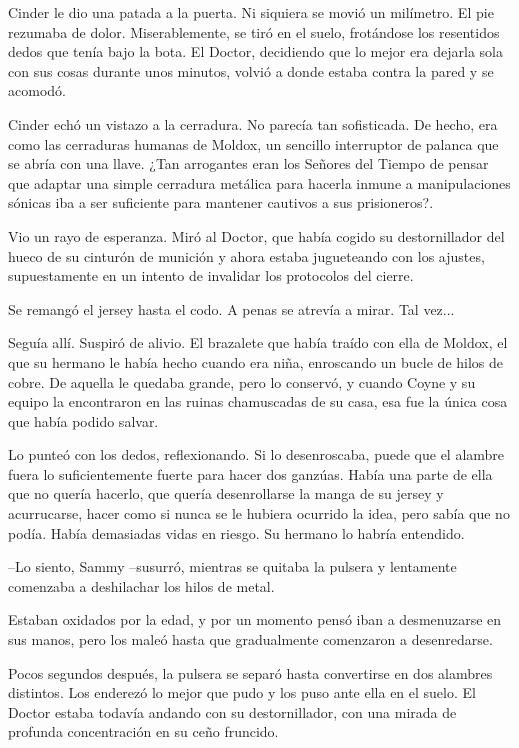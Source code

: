 Cinder le dio una patada a la puerta. Ni siquiera se movió un milímetro. El pie rezumaba de dolor. Miserablemente, se tiró en el suelo, frotándose los resentidos dedos que tenía bajo la bota. El Doctor, decidiendo que lo mejor era dejarla sola con sus cosas durante unos minutos, volvió a donde estaba contra la pared y se acomodó.

Cinder echó un vistazo a la cerradura. No parecía tan sofisticada. De hecho, era como las cerraduras humanas de Moldox, un sencillo interruptor de palanca que se abría con una llave. ¿Tan arrogantes eran los Señores del Tiempo de pensar que adaptar una simple cerradura metálica para hacerla inmune a manipulaciones sónicas iba a ser suficiente para mantener cautivos a sus prisioneros?.

Vio un rayo de esperanza. Miró al Doctor, que había cogido su destornillador del hueco de su cinturón de munición y ahora estaba jugueteando con los ajustes, supuestamente en un intento de invalidar los protocolos del cierre.

Se remangó el jersey hasta el codo. A penas se atrevía a mirar. Tal vez...

Seguía allí. Suspiró de alivio. El brazalete que había traído con ella de Moldox, el que su hermano le había hecho cuando era niña, enroscando un bucle de hilos de cobre. De aquella le quedaba grande, pero lo conservó, y cuando Coyne y su equipo la encontraron en las ruinas chamuscadas de su casa, esa fue la única cosa que había podido salvar.

Lo punteó con los dedos, reflexionando. Si lo desenroscaba, puede que el alambre fuera lo suficientemente fuerte para hacer dos ganzúas. Había una parte de ella que no quería hacerlo, que quería desenrollarse la manga de su jersey y acurrucarse, hacer como si nunca se le hubiera ocurrido la idea, pero sabía que no podía. Había demasiadas vidas en riesgo. Su hermano lo habría entendido.



--Lo siento, Sammy --susurró, mientras se quitaba la pulsera y lentamente comenzaba a deshilachar los hilos de metal.



Estaban oxidados por la edad, y por un momento pensó iban a desmenuzarse en sus manos, pero los maleó hasta que gradualmente comenzaron a desenredarse.

Pocos segundos después, la pulsera se separó hasta convertirse en dos alambres distintos. Los enderezó lo mejor que pudo y los puso ante ella en el suelo. El Doctor estaba todavía andando con su destornillador, con una mirada de profunda concentración en su ceño fruncido.

